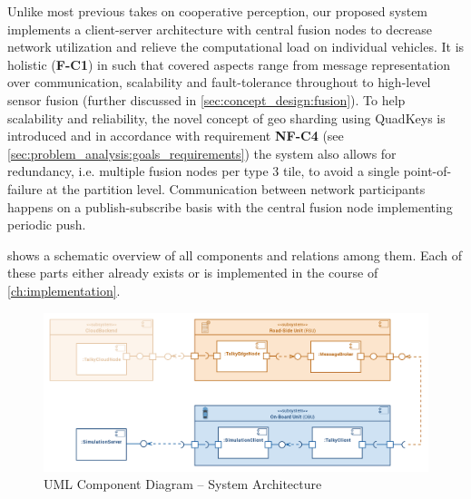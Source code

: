 Unlike most previous takes on cooperative perception, our proposed system implements a client-server architecture with central fusion nodes to decrease network utilization and relieve the computational load on individual vehicles. It is holistic (\textbf{F-C1}) in such that covered aspects range from message representation over communication, scalability and fault-tolerance throughout to high-level sensor fusion (further discussed in \cref{sec:concept_design:fusion}). To help scalability and reliability, the novel concept of geo sharding using QuadKeys is introduced and in accordance with requirement \textbf{NF-C4} (see \cref{sec:problem_analysis:goals_requirements}) the system also allows for redundancy, i.e. multiple fusion nodes per type 3 tile, to avoid a single point-of-failure at the partition level. Communication between network participants happens on a publish-subscribe basis with the central fusion node implementing periodic push.

 shows a schematic overview of all components and relations among them. Each of these parts either already exists or is implemented in the course of \cref{ch:implementation}.

\begin{figure}
	\centering
	\includegraphics[width=1\linewidth]{98_images/components_plain}
	\caption{UML Component Diagram – System Architecture}
	\label{fig:components_plain}
\end{figure}


